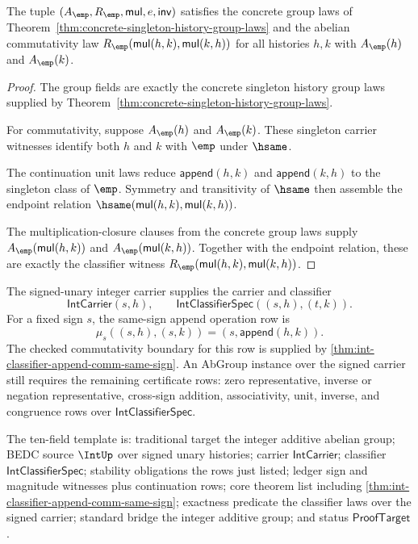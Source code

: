 \begin{theorem}
\label{thm:concrete-singleton-history-abgroup-laws}
The tuple $(A_{\emp},R_{\emp},\mathsf{mul},e,\mathsf{inv})$ satisfies the
concrete group laws of Theorem~\ref{thm:concrete-singleton-history-group-laws}
and the abelian commutativity law
$R_{\emp}(\mathsf{mul}(h,k),\mathsf{mul}(k,h))$ for all histories $h,k$ with
$A_{\emp}(h)$ and $A_{\emp}(k)$.
\end{theorem}
\begin{proof}
The group fields are exactly the concrete singleton history group laws supplied
by Theorem~\ref{thm:concrete-singleton-history-group-laws}.

For commutativity, suppose $A_{\emp}(h)$ and $A_{\emp}(k)$. These singleton
carrier witnesses identify both $h$ and $k$ with $\emp$ under $\hsame$.

The continuation unit laws reduce $\mathsf{append}(h,k)$ and
$\mathsf{append}(k,h)$ to the singleton class of $\emp$. Symmetry and
transitivity of $\hsame$ then assemble the endpoint relation
$\hsame(\mathsf{mul}(h,k),\mathsf{mul}(k,h))$.

The multiplication-closure clauses from the concrete group laws supply
$A_{\emp}(\mathsf{mul}(h,k))$ and $A_{\emp}(\mathsf{mul}(k,h))$. Together with
the endpoint relation, these are exactly the classifier witness
$R_{\emp}(\mathsf{mul}(h,k),\mathsf{mul}(k,h))$.
\end{proof}

\begin{definition}
\label{def:abgroup-int-additive-obligation-boundary}
The signed-unary integer carrier supplies the carrier and classifier
$$
\mathsf{IntCarrier}(s,h),\qquad
\mathsf{IntClassifierSpec}((s,h),(t,k)).
$$
For a fixed sign $s$, the same-sign append operation row is
$$
\mu_s((s,h),(s,k))=(s,\mathsf{append}(h,k)).
$$
The checked commutativity boundary for this row is supplied by
\autoref{thm:int-classifier-append-comm-same-sign}. An AbGroup instance over the
signed carrier still requires the remaining certificate rows: zero
representative, inverse or negation representative, cross-sign addition,
associativity, unit, inverse, and congruence rows over
$\mathsf{IntClassifierSpec}$.

The ten-field template is: traditional target the integer additive abelian
group; BEDC source $\IntUp$ over signed unary histories; carrier
$\mathsf{IntCarrier}$; classifier $\mathsf{IntClassifierSpec}$; stability
obligations the rows just listed; ledger sign and magnitude witnesses plus
continuation rows; core theorem list including
\autoref{thm:int-classifier-append-comm-same-sign}; exactness predicate the
classifier laws over the signed carrier; standard bridge the integer additive
group; and status $\mathsf{ProofTarget}$.
\end{definition}

